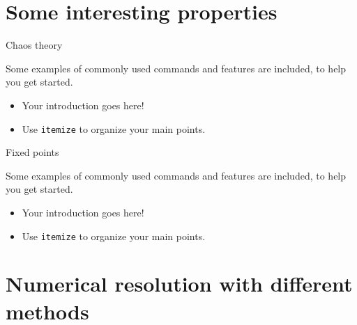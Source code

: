 \documentclass[10pt,xcolor={table,dvipsnames},t]{beamer}
\begin{document}
\section{Some interesting properties}

\begin{frame}{Chaos theory}

    Some examples of commonly used commands and features are included, to help you get started.
    \begin{itemize}
      \item Your introduction goes here!
      \item Use \texttt{itemize} to organize your main points.
    \end{itemize}

\end{frame}

\begin{frame}{Fixed points}

    Some examples of commonly used commands and features are included, to help you get started.
    \begin{itemize}
      \item Your introduction goes here!
      \item Use \texttt{itemize} to organize your main points.
    \end{itemize}

\end{frame}

\section{Numerical resolution with different methods}
\end{document}
